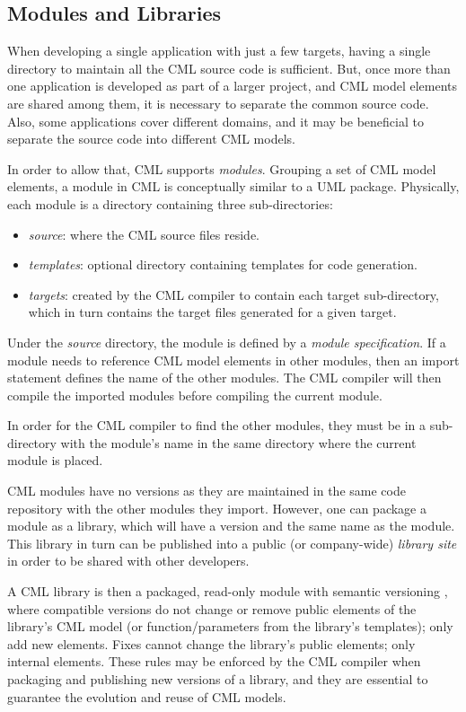 \subsection{Modules and Libraries}\label{subsec:modlib}

When developing a single application with just a few targets, having a single directory to maintain all the CML source code is sufficient. But, once more than one application is developed as part of a larger project, and CML model elements are shared among them, it is necessary to separate the common source code. Also, some applications cover different domains, and it may be beneficial to separate the source code into different CML models.

In order to allow that, CML supports \emph{modules}. Grouping a set of CML model elements, a module in CML is conceptually similar to a UML \cite{uml} package. Physically, each module is a directory containing three sub-directories:

\begin{itemize}
\item \emph{source}: where the CML source files reside.
\item \emph{templates}: optional directory containing templates for code generation.
\item \emph{targets}: created by the CML compiler to contain each target sub-directory, which in turn contains the target files generated for a given target.
\end{itemize}

Under the \emph{source} directory, the module is defined by a \emph{module specification}. If a module needs to reference CML model elements in other modules, then an import statement defines the name of the other modules. The CML compiler will then compile the imported modules before compiling the current module.

In order for the CML compiler to find the other modules, they must be in a sub-directory with the module's name in the same directory where the current module is placed.

CML modules have no versions as they are maintained in the same code repository with the other modules they import. However, one can package a module as a library, which will have a version and the same name as the module. This library in turn can be published into a public (or company-wide) \emph{library site} in order to be shared with other developers. 

A CML library is then a packaged, read-only module with semantic versioning \cite{semver}, where compatible versions do not change or remove public elements of the library's CML model (or function/parameters from the library's templates); only add new elements. Fixes cannot change the library's public elements; only internal elements. These rules may be enforced by the CML compiler when packaging and publishing new versions of a library, and they are essential to guarantee the evolution and reuse of CML models. 
